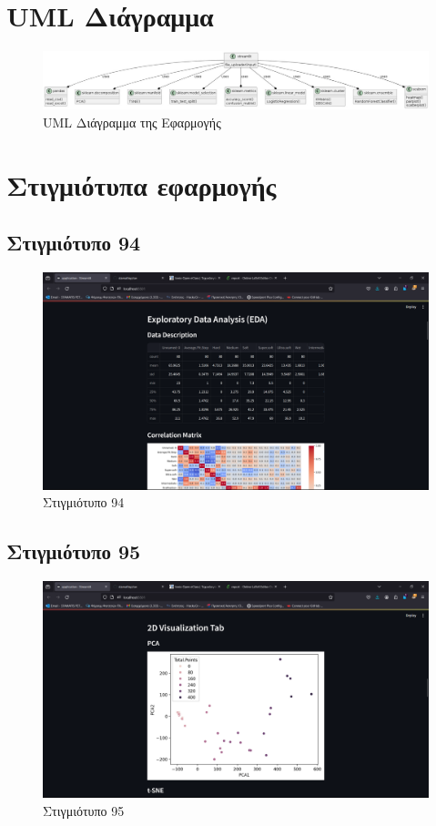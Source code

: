 \documentclass{article}
\begin{document}
\section{UML Διάγραμμα}
\begin{figure}[h]
    \centering
    \includegraphics[width=\textwidth]{UML_diagram.jpg}
    \caption{UML Διάγραμμα της Εφαρμογής}
\end{figure}

\section{Στιγμιότυπα εφαρμογής}

\subsection{Στιγμιότυπο 94}
\begin{figure}[h!]
    \centering
    \includegraphics[width=\textwidth]{Screenshot (94).png}
    \caption{Στιγμιότυπο 94}
    \label{fig:screenshot94}
\end{figure}

\subsection{Στιγμιότυπο 95}
\begin{figure}[h!]
    \centering
    \includegraphics[width=\textwidth]{Screenshot (95).png}
    \caption{Στιγμιότυπο 95}
    \label{fig:screenshot95}
\end{figure}
\end{document}
